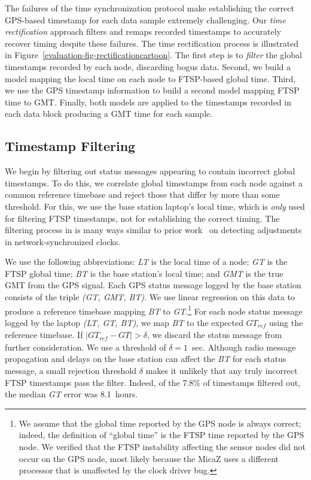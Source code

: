 The failures of the time synchronization protocol make establishing the
correct GPS-based timestamp for each data sample extremely challenging. Our
\textit{time rectification} approach filters and remaps recorded timestamps
to accurately recover timing despite these failures. The time rectification
process is illustrated in Figure~\ref{evaluation-fig-rectificationcartoon}.
The first step is to \textit{filter} the global timestamps recorded by each
node, discarding bogus data. Second, we build a model mapping the local time
on each node to FTSP-based global time. Third, we use the GPS timestamp
information to build a second model mapping FTSP time to GMT. Finally, both
models are applied to the timestamps recorded in each data block producing a
GMT time for each sample.

\subsection{Timestamp Filtering}
\label{evaluation-subsection-filtering}

We begin by filtering out status messages appearing to contain incorrect
global timestamps. To do this, we correlate global timestamps from each node
against a common reference timebase and reject those that differ by more than
some threshold. For this, we use the base station laptop's local time, which
is \textit{only} used for filtering FTSP timestamps, not for establishing the
correct timing. The filtering process in is many ways similar to prior
work~\cite{paxson98calibrating,1028824} on detecting adjustments in
network-synchronized clocks.

We use the following abbreviations: \textit{LT} is the local time of a node;
\textit{GT} is the FTSP global time; \textit{BT} is the base station's local
time; and \textit{GMT} is the true GMT from the GPS signal. Each GPS status
message logged by the base station consists of the triple \textit{(GT, GMT,
BT)}. We use linear regression on this data to produce a reference timebase
mapping \textit{BT} to \textit{GT}.\footnote{We assume that the global time
reported by the GPS node is always correct; indeed, the definition of
``global time'' is the FTSP time reported by the GPS node. We verified that
the FTSP instability affecting the sensor nodes did not occur on the GPS
node, most likely because the MicaZ uses a different processor that is
unaffected by the clock driver bug.} For each node status message logged by
the laptop \textit{(LT, GT, BT)}, we map \textit{BT} to the expected
$\mathit{GT}_{\mathit{ref}}$ using the reference timebase. If $ \mid
\mathit{GT}_{\mathit{ref}} - \mathit{GT} \mid > \delta$, we discard the
status message from further consideration. We use a threshold of $\delta =
1$~sec. Although radio message propagation and delays on the base station can
affect the \textit{BT} for each status message, a small rejection threshold
$\delta$ makes it unlikely that any truly incorrect FTSP timestamps pass the
filter. Indeed, of the 7.8\% of timestamps filtered out, the median
\textit{GT} error was 8.1~hours.


